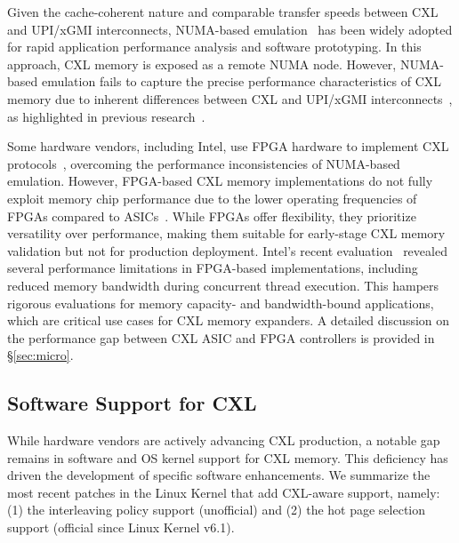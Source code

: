  Given the cache-coherent nature and comparable transfer speeds between CXL and UPI/xGMI interconnects, NUMA-based emulation~\cite{pond, tpp} has been widely adopted for rapid application performance analysis and software prototyping. In this approach, CXL memory is exposed as a remote NUMA node. However, NUMA-based emulation fails to capture the precise performance characteristics of CXL memory due to inherent differences between CXL and UPI/xGMI interconnects~\cite{cxldatabase}, as highlighted in previous research~\cite{demystify}.

 Some hardware vendors, including Intel, use FPGA hardware to implement CXL protocols~\cite{intelfpga}, overcoming the performance inconsistencies of NUMA-based emulation. However, FPGA-based CXL memory implementations do not fully exploit memory chip performance due to the lower operating frequencies of FPGAs compared to ASICs~\cite{fpgaasic}. While FPGAs offer flexibility, they prioritize versatility over performance, making them suitable for early-stage CXL memory validation but not for production deployment. Intel’s recent evaluation~\cite{demystify} revealed several performance limitations in FPGA-based implementations, including reduced memory bandwidth during concurrent thread execution. This hampers rigorous evaluations for memory capacity- and bandwidth-bound applications, which are critical use cases for CXL memory expanders. A detailed discussion on the performance gap between CXL ASIC and FPGA controllers is provided in \S\ref{sec:micro}.

\subsection{Software Support for CXL}

\label{ssec:cxlsoftware}
While hardware vendors are actively advancing CXL production, a notable gap remains in software and OS kernel support for CXL memory. This deficiency has driven the development of specific software enhancements. We summarize the most recent patches in the Linux Kernel that add CXL-aware support, namely: (1) the interleaving policy support (unofficial) and (2) the hot page selection support (official since Linux Kernel v6.1).


